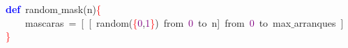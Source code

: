\noindent
\mbox{}\textbf{\textcolor{Blue}{def}}\ random$\_$mask\textcolor{BrickRed}{(}n\textcolor{BrickRed}{)}\textcolor{Red}{\{} \\
\mbox{}\ \ \ \ mascaras\ \textcolor{BrickRed}{=}\ \textcolor{BrickRed}{[}\ \textcolor{BrickRed}{[}\ random\textcolor{BrickRed}{(}\textcolor{Red}{\{}\textcolor{Purple}{0}\textcolor{BrickRed}{,}\textcolor{Purple}{1}\textcolor{Red}{\}}\textcolor{BrickRed}{)}\ from\ \textcolor{Purple}{0}\ to\ n\textcolor{BrickRed}{]}\ from\ \textcolor{Purple}{0}\ to\ max$\_$arranques\ \textcolor{BrickRed}{]} \\
\mbox{}\textcolor{Red}{\}} \\
\mbox{}
